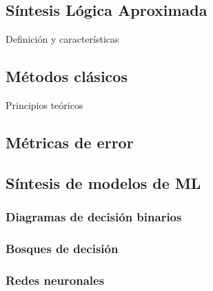 \subsection{Síntesis Lógica Aproximada}

Definición y características

\subsection{Métodos clásicos}

Principios teóricos

\subsection{Métricas de error}

\subsection{Síntesis de modelos de ML}

\subsubsection{Diagramas de decisión binarios}

\subsubsection{Bosques de decisión}

\subsubsection{Redes neuronales}
